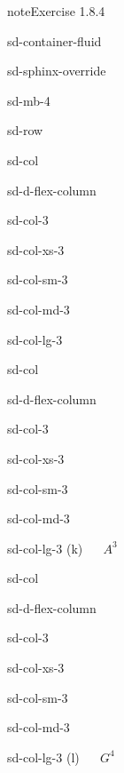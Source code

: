 \documentclass[letterpaper,10pt,english]{jupyterBook}
\begin{document}
\begin{sphinxadmonition}{note}{Exercise 1.8.4}
\begin{sphinxuseclass}{sd-container-fluid}
\begin{sphinxuseclass}{sd-sphinx-override}
\begin{sphinxuseclass}{sd-mb-4}
\begin{sphinxuseclass}{sd-row}
\begin{sphinxuseclass}{sd-col}
\begin{sphinxuseclass}{sd-d-flex-column}
\begin{sphinxuseclass}{sd-col-3}
\begin{sphinxuseclass}{sd-col-xs-3}
\begin{sphinxuseclass}{sd-col-sm-3}
\begin{sphinxuseclass}{sd-col-md-3}
\begin{sphinxuseclass}{sd-col-lg-3}
\end{sphinxuseclass}
\end{sphinxuseclass}
\end{sphinxuseclass}
\end{sphinxuseclass}
\end{sphinxuseclass}
\end{sphinxuseclass}
\end{sphinxuseclass}
\begin{sphinxuseclass}{sd-col}
\begin{sphinxuseclass}{sd-d-flex-column}
\begin{sphinxuseclass}{sd-col-3}
\begin{sphinxuseclass}{sd-col-xs-3}
\begin{sphinxuseclass}{sd-col-sm-3}
\begin{sphinxuseclass}{sd-col-md-3}
\begin{sphinxuseclass}{sd-col-lg-3}
\sphinxAtStartPar
(k)    \(A^3\)

\end{sphinxuseclass}
\end{sphinxuseclass}
\end{sphinxuseclass}
\end{sphinxuseclass}
\end{sphinxuseclass}
\end{sphinxuseclass}
\end{sphinxuseclass}
\begin{sphinxuseclass}{sd-col}
\begin{sphinxuseclass}{sd-d-flex-column}
\begin{sphinxuseclass}{sd-col-3}
\begin{sphinxuseclass}{sd-col-xs-3}
\begin{sphinxuseclass}{sd-col-sm-3}
\begin{sphinxuseclass}{sd-col-md-3}
\begin{sphinxuseclass}{sd-col-lg-3}
\sphinxAtStartPar
(l)    \(G^4\)

\end{sphinxuseclass}
\end{sphinxuseclass}
\end{sphinxuseclass}
\end{sphinxuseclass}
\end{sphinxuseclass}
\end{sphinxuseclass}
\end{sphinxuseclass}
\end{sphinxuseclass}
\end{sphinxuseclass}
\end{sphinxuseclass}
\end{sphinxuseclass}\end{sphinxadmonition}
 \label{exercise:matrices-ex-determinants}
\end{document}

